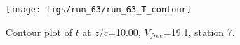 \begin{figure}[H]
\centering
\texttt{[image: figs/run\_63/run\_63\_T\_contour]}
\caption{Contour plot of $\overline{t}$ at $z/c$=10.00, $V_{free}$=19.1, station 7.}
\end{figure}


